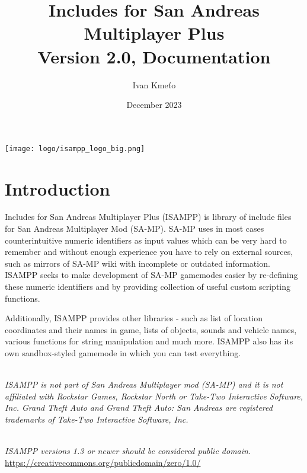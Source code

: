 \documentclass{article}
\title{Includes for San Andreas Multiplayer Plus\\Version 2.0, Documentation}
\author{Ivan Kmeťo}
\date{December 2023}
\begin{document}
\maketitle
\begin{center}
\texttt{[image: logo/isampp\_logo\_big.png]}
\end{center}


\newpage
\tableofcontents


\newpage
\section{Introduction}
Includes for San Andreas Multiplayer Plus (ISAMPP) is library of include files for San Andreas Multiplayer Mod (SA-MP). SA-MP uses in most cases counterintuitive numeric identifiers as input values which can be very hard to remember and without enough experience you have to rely on external sources, such as mirrors of SA-MP wiki with incomplete or outdated information. ISAMPP seeks to make development of SA-MP gamemodes easier by re-defining these numeric identifiers and by providing collection of useful custom scripting functions.

\bigskip
\noindent Additionally, ISAMPP provides other libraries - such as list of location coordinates and their names in game, lists of objects, sounds and vehicle names, various functions for string manipulation and much more. ISAMPP also has its own sandbox-styled gamemode in which you can test everything.

\textit{\\ISAMPP is not part of San Andreas Multiplayer mod (SA-MP) and it is not affiliated with Rockstar Games, Rockstar North or Take-Two Interactive Software, Inc. Grand Theft Auto and Grand Theft Auto: San Andreas are registered trademarks of Take-Two Interactive Software, Inc.}

\textit{\\ISAMPP versions 1.3 or newer should be considered public domain.}
\\\url{https://creativecommons.org/publicdomain/zero/1.0/}
\end{document}
